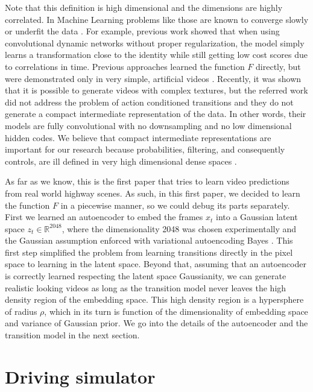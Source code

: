 \documentclass{article} %
\begin{document}
Note that this definition is high dimensional and the dimensions are highly correlated. In Machine Learning problems like those are known to converge slowly
or underfit the data \cite{principebook}. For example, previous work \cite{mydpcn} showed that when using convolutional dynamic networks
without proper regularization, the model simply learns a transformation close to the identity while still getting low cost scores due to correlations in time.
Previous approaches learned the function $F$ directly, but were demonstrated only in very simple, artificial videos \cite{condpred}.
Recently, it was shown \cite{mydpcn} \cite{beyondmse} that it is possible to generate videos with complex textures, but the referred work did not address the problem
of action conditioned transitions and they do not generate a compact intermediate representation of the data. In other words, their models are fully convolutional with
no downsampling and no low dimensional hidden codes. We believe that compact intermediate representations
are important for our research because probabilities, filtering, and consequently controls, are ill defined in very high dimensional dense spaces \cite{probhigh}.

As far as we know, this is the first paper that tries to learn video predictions from real world highway scenes.
As such, in this first paper, we decided to learn the function $F$ in a piecewise manner, so we could debug its parts separately.
First we learned an autoencoder to embed the frames $x_t$ into a Gaussian latent space $z_t \in \mathbb{R}^{2048}$, where the dimensionality
2048 was chosen experimentally and the Gaussian assumption enforced with variational autoencoding Bayes \cite{VAE}. This first step
simplified the problem from learning transitions directly in the pixel space to learning in the latent space. Beyond that, assuming
that an autoencoder is correctly learned respecting the latent space Gaussianity, we can generate realistic looking videos as long as the
transition model never leaves the high density region of the embedding space. This high density region is a hypersphere of radius
$\rho$, which in its turn is function of the dimensionality of embedding space and variance of Gaussian prior. We go into the details of
the autoencoder and the transition model in the next section.

\section{Driving simulator}
\label{sec:raodsim}
\end{document}
